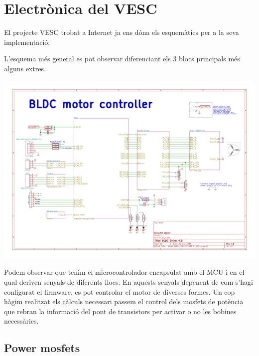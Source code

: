 \section{Electrònica del VESC}
El projecte VESC trobat a Internet ja ens dóna els esquemàtics per a la seva implementació:

L'esquema més general es pot observar diferenciant els 3 blocs principals més alguns extres.
    
\includegraphics[width=\textwidth]{VESC/Schematic-1}
       
Podem observar que tenim el microcontrolador encapsulat amb el MCU i en el qual deriven senyals de diferents llocs. En aquests senyals depenent de com s'hagi configurat el firmware, es pot controlar el motor de diverses formes. Un cop hàgim realitzat els càlculs necessari passem el control dels mosfets de potència que rebran la informació del pont de transistors per activar o no les bobines necessàries.     
     
\subsection{Power mosfets}

